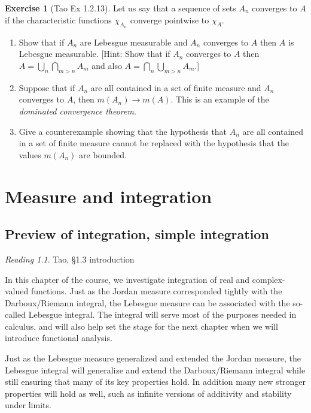 \documentclass[11pt,oneside]{amsbook}
\theoremstyle{definition}
\newtheorem{exerc}{Exercise}[section]
\theoremstyle{plain}
\theoremstyle{definition}
\theoremstyle{remark}
\newtheorem*{reading}{Reading}
\numberwithin{equation}{section}
\numberwithin{figure}{section}
\begin{document}
\begin{exerc}[Tao Ex 1.2.13]
  Let us say that a sequence of sets $A_n$ converges to $A$ if the characteristic functions $\chi_{A_n}$ converge pointwise to $\chi_A$.
  \begin{enumerate}
    \item Show that if $A_n$ are Lebesgue measurable and $A_n$ converges to $A$ then $A$ is Lebesgue measurable. [Hint: Show that if $A_n$ converges to $A$ then $A=\bigcup_n\bigcap_{m>n}A_m$ and also $A=\bigcap_n\bigcup_{m>n}A_m$.]
    \item Suppose that if $A_n$ are all contained in a set of finite measure and $A_n$ converges to $A$, then $m(A_n)\to m(A)$. This is an example of the \emph{dominated convergence theorem}.
    \item Give a counterexample showing that the hypothesis that $A_n$ are all contained in a set of finite measure cannot be replaced with the hypothesis that the values $m(A_n)$ are bounded.
  \end{enumerate}
\end{exerc}

\chapter{Measure and integration}

\section{Preview of integration, simple integration}

\begin{reading}
  Tao, \S 1.3 introduction
\end{reading}

In this chapter of the course, we investigate integration of real and complex-valued functions. Just as the Jordan measure corresponded tightly with the Darboux/Riemann integral, the Lebesgue measure can be associated with the so-called Lebesgue integral. The integral will serve most of the purposes needed in calculus, and will also help set the stage for the next chapter when we will introduce functional analysis.

Just as the Lebesgue measure generalized and extended the Jordan measure, the Lebesgue integral will generalize and extend the Darboux/Riemann integral while still ensuring that many of its key properties hold. In addition many new stronger properties will hold as well, such as infinite versions of additivity and stability under limits.
\end{document}
